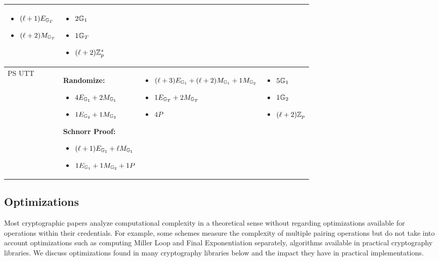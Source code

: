 \begin{tabular}{|l|p{4.5cm}|p{4.5cm}|p{3.5cm}|}
\begin{itemize}[nosep]
        \item $(\ell+1)E_{\mathbb{G}_T}$
        \item $(\ell+2)M_{\mathbb{G}_T}$
    \end{itemize}
    & 
    \begin{itemize}[nosep]
        \item $2\mathbb{G}_1$
        \item $1\mathbb{G}_T$
        \item $(\ell+2)\mathbb{Z}_p^*$
    \end{itemize}
    \\
    \hline
    PS UTT &
    \textbf{Randomize:}
    \begin{itemize}[nosep]
        \item $4E_{\mathbb{G}_1} + 2M_{\mathbb{G}_1}$ 
        \item $1E_{\mathbb{G}_2} + 1M_{\mathbb{G}_2}$
    \end{itemize}
    \textbf{Schnorr Proof:}
    \begin{itemize}[nosep]
        \item $(\ell+1)E_{\mathbb{G}_1} + \ell M_{\mathbb{G}_1}$ 
        \item $1E_{\mathbb{G}_1} + 1M_{\mathbb{G}_2} + 1P$ 
    \end{itemize}
    &
    \begin{itemize}[nosep]
        \item $(\ell+3)E_{\mathbb{G}_1} + (\ell+2)M_{\mathbb{G}_1} + 1M_{\mathbb{G}_2}$
        \item $1E_{\mathbb{G}_T} + 2M_{\mathbb{G}_T}$
        \item $4P$ 
    \end{itemize}
    &
    \begin{itemize}[nosep]
        \item $5\mathbb{G}_1$
        \item $1\mathbb{G}_2$
        \item $(\ell+2)\mathbb{Z}_p$
    \end{itemize}
    \\
    
     \hline
\end{tabular}






% 
% 

\newpage
\subsection{Optimizations}
Most cryptographic papers analyze computational complexity in a theoretical sense without regarding optimizations available for operations within their credentials. 
For example, some schemes measure the complexity of multiple pairing operations \cite{sako_short_2016} but do not take into account optimizations such as computing Miller Loop and Final Exponentiation separately, algorithms available in practical cryptography libraries. We discuss optimizations found in many cryptography libraries below and the impact they have in practical implementations.

